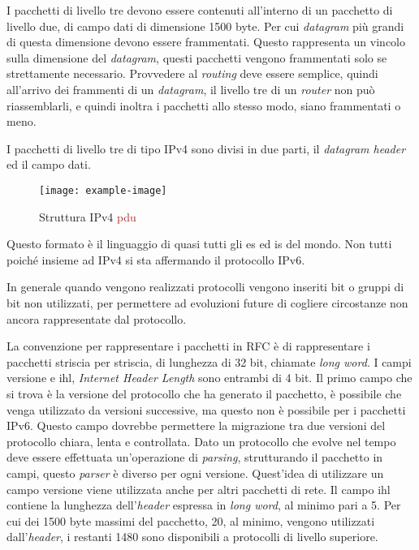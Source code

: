 \documentclass{article}
\numberwithin{equation}{subsection}
\begin{document}
I pacchetti di livello tre devono essere contenuti all'interno di un pacchetto di livello due, di campo dati di dimensione 1500 byte. Per cui \textit{datagram} più grandi 
di questa dimensione devono essere frammentati. 
Questo rappresenta un vincolo sulla dimensione del \textit{datagram}, questi pacchetti vengono frammentati solo se strettamente necessario. Provvedere al \textit{routing} deve essere semplice, quindi 
all'arrivo dei frammenti di un \textit{datagram}, il livello tre di un \textit{router} non può riassemblarli, e quindi inoltra i pacchetti allo stesso modo, siano frammentati o meno. 

I pacchetti di livello tre di tipo \textcolor{BurntOrange}{IPv4} sono divisi in due parti, il \textit{datagram \textit{header}} ed il campo dati. 

\begin{figure}[H]%
    \centering%
    \texttt{[image: example-image]}%
    \caption{Struttura \textcolor{BurntOrange}{IPv4} \textcolor{Brown}{pdu}}%
\end{figure}

Questo formato è il linguaggio di quasi tutti gli \textcolor{Periwinkle}{es} ed \textcolor{Emerald}{is} del mondo. Non tutti poiché insieme ad \textcolor{BurntOrange}{IPv4} si sta affermando il protocollo \textcolor{OliveGreen}{IPv6}. 

In generale quando vengono realizzati protocolli vengono inseriti bit o gruppi di bit non utilizzati, per permettere ad evoluzioni future di cogliere circostanze non ancora 
rappresentate dal protocollo. 


La convenzione per rappresentare i pacchetti in RFC è di rappresentare i pacchetti striscia per striscia, di lunghezza di 32 bit, chiamate \textit{long word}. 
I campi versione e ihl, \textit{Internet Header Length} sono entrambi di 4 bit. Il primo campo che si trova è la versione del protocollo che ha generato il pacchetto, è possibile che venga utilizzato da versioni successive, ma questo non è possibile 
per i pacchetti \textcolor{OliveGreen}{IPv6}. Questo campo dovrebbe permettere la migrazione tra due versioni del protocollo chiara, lenta e controllata. Dato un 
protocollo che evolve nel tempo deve essere effettuata un'operazione di \textit{parsing}, strutturando il pacchetto in campi, questo \textit{parser} è diverso per ogni versione. 
Quest'idea 
di utilizzare un campo versione viene utilizzata anche per altri pacchetti di rete. Il campo ihl contiene la lunghezza dell'\textit{header} espressa in \textit{long word}, al minimo pari a 5. 
Per cui dei 1500 byte massimi del pacchetto, 20, al minimo, vengono utilizzati dall'\textit{header}, i restanti 1480 sono disponibili a protocolli di livello superiore. 
\end{document}
